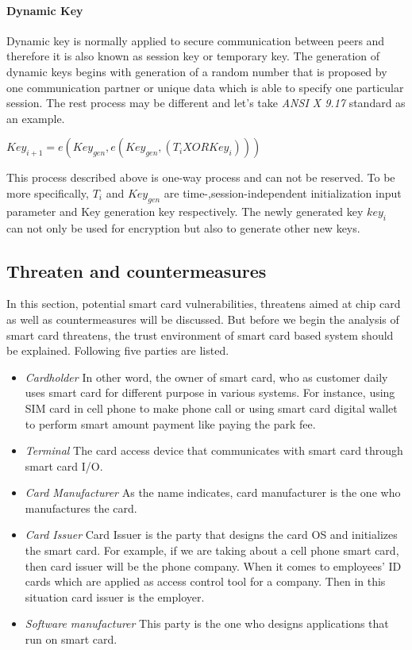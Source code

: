 \paragraph{Dynamic Key}
Dynamic key is normally applied to secure communication between peers and therefore it is also known as session key or temporary key. The generation of dynamic keys begins with generation of a random number that is proposed by one communication partner or unique data which is able to specify one particular session. The rest process may be different and let's take \emph{ANSI X 9.17} standard as an example\cite{handbook}. 
\begin{center}
$Key_{i+1} = e(Key_{gen},e(Key_{gen},(T_{i} XOR Key_{i})))$
\end{center}
This process described above is one-way process and can not be reserved. To be more specifically, $T_{i}$ and  $Key_{gen}$ are time-,session-independent initialization input parameter and Key generation key respectively. The newly generated  key $key_{i}$ can not only be used for encryption but also to generate other new keys.
\subsection{Threaten and countermeasures}
In this section, potential smart card vulnerabilities, threatens aimed at chip card as well as countermeasures will be discussed. But before we begin the analysis of smart card threatens, the trust environment of smart card based system should be explained. Following five parties are listed\cite{smart_card_attack1}.
\begin{itemize}
\item \emph{Cardholder} In other word, the owner of smart card, who as customer daily uses smart card for different purpose  in various systems. For instance, using SIM card in cell phone to make phone call or using smart card digital wallet to perform smart amount payment like paying the park fee.
\item \emph{Terminal} The card access device that communicates with smart card through smart card I/O.
\item \emph{Card Manufacturer} As the name indicates, card manufacturer is the one who manufactures  the card.
\item \emph{Card Issuer} Card Issuer is the party that designs the card OS and initializes the smart card. For example, if we are taking about a cell phone smart card, then card issuer will be the phone company. When it comes to employees' ID cards which are applied as access control tool for a company. Then in this situation card issuer is the employer.
\item \emph{Software manufacturer} This party is the one who designs applications that run on smart card.
\end{itemize}
